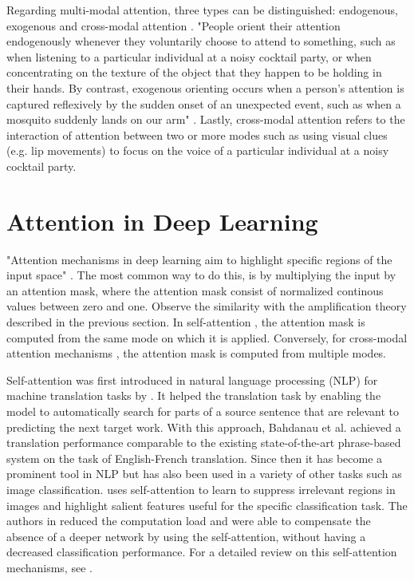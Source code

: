 Regarding multi-modal attention, three types can be distinguished: endogenous, exogenous and cross-modal attention \citep{crossmodal}. "People orient their attention endogenously whenever they voluntarily choose to attend to something, such as when listening to a particular individual at a noisy cocktail party, or when concentrating on the texture of the object that they happen to be holding in their hands. By contrast, exogenous orienting occurs when a person's attention is captured reflexively by the sudden onset of an unexpected event, such as when a mosquito suddenly lands on our arm" \citep{crossmodal}. Lastly, cross-modal attention refers to the interaction of attention between two or more modes such as using visual clues (e.g. lip movements) to focus on the voice of a particular individual at a noisy cocktail party.


\section{Attention in Deep Learning}
"Attention mechanisms in deep learning aim to highlight specific regions of the input space" \citep{attentive-survey}. The most common way to do this, is by multiplying the input by an attention mask, where the attention mask consist of normalized continous values between zero and one. Observe the similarity with the amplification theory described in the previous section. In self-attention \citep{bahdanau}, the attention mask is computed from the same mode on which it is applied. Conversely, for cross-modal attention mechanisms \citep{crossmodal-object-detection}, the attention mask is computed from multiple modes. 

Self-attention was first introduced in natural language processing (NLP) for machine translation tasks by \citep{bahdanau}. It helped the translation task by enabling the model to automatically search for parts of a source sentence that are relevant to predicting the next target work. With this approach, Bahdanau et al. achieved a translation performance comparable to the existing state-of-the-art phrase-based system on the task of English-French translation. Since then it has become a prominent tool in NLP but has also been used in a variety of other tasks such as image classification. \citep{self-capsule} uses self-attention to learn to suppress irrelevant regions in images and highlight salient features useful for the specific classification task. The authors in \citep{self-capsule} reduced the computation load and were able to compensate the absence of a deeper network by using the self-attention, without having a decreased classification performance. For a detailed review on this self-attention mechanisms, see \citep{attention-review}.

